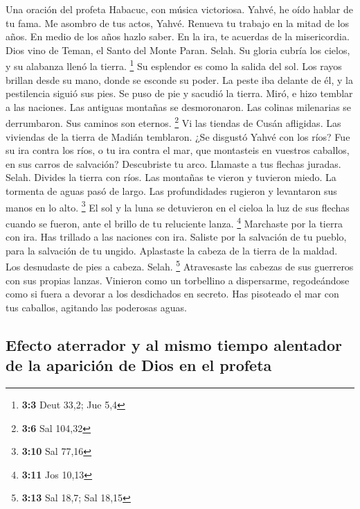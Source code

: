 Una oración del profeta Habacuc, con música victoriosa.
 Yahvé, he oído hablar de tu fama. Me asombro de tus
actos, Yahvé. Renueva tu trabajo en la mitad de los años. En medio de
los años hazlo saber. En la ira, te acuerdas de la misericordia.
 Dios vino de Teman, el Santo del Monte Paran. Selah. Su
gloria cubría los cielos, y su alabanza llenó la tierra. \footnote{\textbf{3:3}
  Deut 33,2; Jue 5,4}  Su esplendor es como la salida del
sol. Los rayos brillan desde su mano, donde se esconde su poder.
 La peste iba delante de él, y la pestilencia siguió sus
pies.  Se puso de pie y sacudió la tierra. Miró, e hizo
temblar a las naciones. Las antiguas montañas se desmoronaron. Las
colinas milenarias se derrumbaron. Sus caminos son eternos. \footnote{\textbf{3:6}
  Sal 104,32}  Vi las tiendas de Cusán afligidas. Las
viviendas de la tierra de Madián temblaron.  ¿Se disgustó
Yahvé con los ríos? Fue su ira contra los ríos, o tu ira contra el mar,
que montasteis en vuestros caballos, en sus carros de salvación?
 Descubriste tu arco. Llamaste a tus flechas juradas.
Selah. Divides la tierra con ríos.  Las montañas te
vieron y tuvieron miedo. La tormenta de aguas pasó de largo. Las
profundidades rugieron y levantaron sus manos en lo alto. \footnote{\textbf{3:10}
  Sal 77,16}  El sol y la luna se detuvieron en el cieloa
la luz de sus flechas cuando se fueron, ante el brillo de tu reluciente
lanza. \footnote{\textbf{3:11} Jos 10,13}  Marchaste por
la tierra con ira. Has trillado a las naciones con ira. 
Saliste por la salvación de tu pueblo, para la salvación de tu ungido.
Aplastaste la cabeza de la tierra de la maldad. Los desnudaste de pies a
cabeza. Selah. \footnote{\textbf{3:13} Sal 18,7; Sal 18,15}
 Atravesaste las cabezas de sus guerreros con sus propias
lanzas. Vinieron como un torbellino a dispersarme, regodeándose como si
fuera a devorar a los desdichados en secreto.  Has
pisoteado el mar con tus caballos, agitando las poderosas aguas.

\hypertarget{efecto-aterrador-y-al-mismo-tiempo-alentador-de-la-apariciuxf3n-de-dios-en-el-profeta}{%
\subsection{Efecto aterrador y al mismo tiempo alentador de la aparición
de Dios en el
profeta}\label{efecto-aterrador-y-al-mismo-tiempo-alentador-de-la-apariciuxf3n-de-dios-en-el-profeta}}

